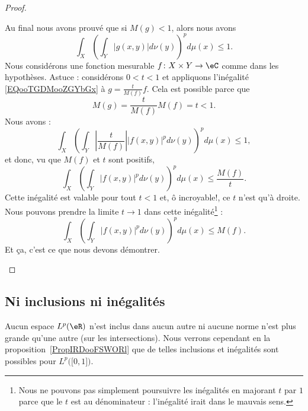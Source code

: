 \begin{proof}
\begin{subproof}
\begin{itemize}
		\end{itemize}
		Au final nous avons prouvé que si \( M(g)<1\), alors nous avons
		\begin{equation}        \label{EQooTGDMooZGYbGx}
			\int_X\left( \int_Y| g(x,y) |d\nu(y) \right)^pd\mu(x)\leq 1.
		\end{equation}
		Nous considérons une fonction mesurable \( f\colon X\times Y\to \eC\) comme dans les hypothèses. Astuce : considérons \( 0<t<1\) et appliquons l'inégalité \eqref{EQooTGDMooZGYbGx} à \( g=\frac{ t }{ M(f) }f\). Cela est possible parce que
		\begin{equation}
			M(g)=\frac{ t }{ M(f) }M(f)=t<1.
		\end{equation}
		Nous avons :
		\begin{equation}
			\int_X\left( \int_Y| \frac{ t }{ M(f) } | |f(x,y) |^pd\nu(y) \right)^pd\mu(x)\leq 1,
		\end{equation}
		et donc, vu que \( M(f)\) et \( t\) sont positifs,
		\begin{equation}
			\int_X\left( \int_Y| f(x,y) |^pd\nu(y) \right)^pd\mu(x)\leq \frac{ M(f) }{ t }.
		\end{equation}
		Cette inégalité est valable pour tout \( t<1\) et, ô incroyable!, ce \( t\) n'est qu'à droite. Nous pouvons prendre la limite \( t\to 1\) dans cette inégalité\footnote{Nous ne pouvons pas simplement poursuivre les inégalités en majorant \(  t\) par \(  1\) parce que le \(  t\) est au dénominateur : l'inégalité irait dans le mauvais sens.}  :
		\begin{equation}
			\int_X\left( \int_Y| f(x,y) |^pd\nu(y) \right)^pd\mu(x)\leq M(f).
		\end{equation}
		Et ça, c'est ce que nous devons démontrer.
	\end{subproof}

\end{proof}


\subsection{Ni inclusions ni inégalités}

Aucun espace \( L^p(\eR)\) n'est inclus dans aucun autre ni aucune norme n'est plus grande qu'une autre (sur les intersections). Nous verrons cependant en la proposition~\ref{PropIRDooFSWORl} que de telles inclusions et inégalités sont possibles pour \( L^p\big( \mathopen[ 0 , 1 \mathclose] \big)\).

